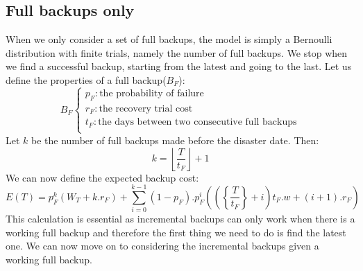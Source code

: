 \documentclass[11pt, a4paper]{article}
\theoremstyle{definition}
\begin{document}
		\subsection{Full backups only}
		When we only consider a set of full backups, the model is simply a Bernoulli distribution with finite trials, namely the number of full backups. We stop when we find a successful backup, starting from the latest and going to the last. Let us define the properties of a full backup($B_F$):
		$$
		B_F
		\begin{cases}
			p_F: \text{the probability of failure}\\
			r_F: \text{the recovery trial cost}\\
			t_F: \text{the days between two consecutive full backups}\\
		\end{cases}
		$$
		Let $k$ be the number of full backups made before the disaster date. Then:
		$$
			k = \left \lfloor{\frac{T}{t_F}}\right \rfloor + 1
		$$
		We can now define the expected backup cost:
		\begin{equation}
		\label{eq:1}
			E(T) = p_F^{k}\left(W_T + k.r_F\right) + \displaystyle \sum_{i=0}^{k-1} (1-p_F).p_F^{i}\left( \left (\left\{ \frac{T}{t_F}\right \} + i\right)t_F.w + (i+1).r_F \right )
		\end{equation}
		This calculation is essential as incremental backups can only work when there is a working full backup and therefore the first thing we need to do is find the latest one. We can now move on to considering the incremental backups given a working full backup.
\end{document}
